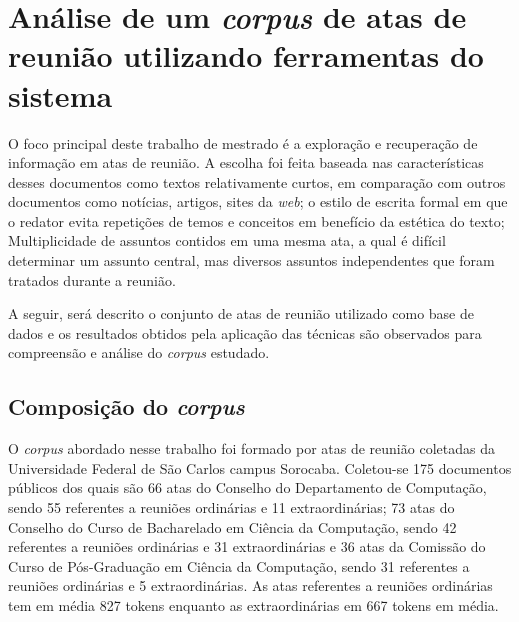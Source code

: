 



\section{Análise de um \textit{corpus} de atas de reunião utilizando ferramentas do sistema}	
\label{sec:aplicacao-sistema}

O foco principal deste trabalho de mestrado é a exploração e recuperação de informação em atas de reunião. A escolha foi feita baseada nas características desses documentos como textos relativamente curtos, em comparação com outros documentos como notícias, artigos, sites da \textit{web}; o estilo de escrita formal em que o redator evita repetições de temos e conceitos em benefício da estética do texto; Multiplicidade de assuntos contidos em uma mesma ata, a qual é difícil determinar um assunto central, mas diversos assuntos independentes que foram tratados durante a reunião.


A seguir, será descrito o conjunto de atas de reunião utilizado como base de dados e os resultados obtidos pela aplicação das técnicas são observados para compreensão e análise do \textit{corpus} estudado.




\subsection{Composição do \textit{corpus} }
\label{subsec:composicaocorpus}

O \textit{corpus} abordado nesse trabalho foi formado por atas de reunião coletadas da Universidade Federal de São Carlos campus Sorocaba. 
Coletou-se 175 documentos públicos 
dos quais são 
66 atas do Conselho do Departamento de Computação, sendo 55 referentes a reuniões ordinárias e 11 extraordinárias;
73 atas do Conselho do Curso de Bacharelado em Ciência da Computação, sendo 42 referentes a reuniões ordinárias e 31 extraordinárias e
36 atas da Comissão do Curso de Pós-Graduação em Ciência da Computação, sendo 31 referentes a reuniões ordinárias e 5 extraordinárias.
As atas referentes a reuniões ordinárias tem em média 827 tokens enquanto as extraordinárias em 667 tokens em média.

